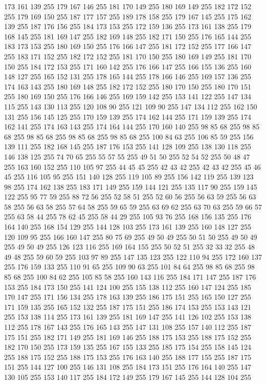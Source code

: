 173 161 139 255 179 167 146 255 181 170 149 255 180 169 149 255 182 172 152 255 179 169 150 255 187 177 157 255 189 178 158 255 179 167 145 255 175 162 139 255 187 176 156 255 184 173 153 255 172 159 136 255 173 161 138 255 179 168 145 255 181 169 147 255 182 169 148 255 182 171 150 255 176 165 144 255 183 173 153 255 180 169 150 255 176 166 147 255 181 172 152 255 177 166 147 255 183 171 152 255 182 172 152 255 181 170 150 255 180 169 149 255 181 170 150 255 184 172 153 255 171 160 142 255 176 166 147 255 166 155 136 255 160 148 127 255 165 152 131 255 178 165 144 255 178 166 146 255 169 157 136 255 174 163 143 255 180 169 148 255 182 172 152 255 180 170 150 255 180 170 151 255 180 169 150 255 176 166 146 255 169 159 142 255 153 141 122 255 147 134 115 255 143 130 113 255 120 108 90 255 121 109 90 255 147 134 112 255 162 150 131 255 156 145 125 255 170 159 139 255 174 162 144 255 171 159 139 255 174 162 141 255 174 163 143 255 174 164 144 255 170 160 140 255 98 85 68 255 98 85 68 255 98 85 68 255
98 85 68 255 98 85 68 255 100 84 63 255 106 85 59 255 156 139 111 255 182 168 145 255 187 176 153 255 141 128 109 255 138 130 118 255 146 138 125 255 74 70 65 255 55 57 55 255 49 51 50 255 52 54 52 255 50 48 47 255 163 160 152 255 110 105 97 255 44 45 45 255 42 43 42 255 42 43 42 255 45 46 45 255 116 105 95 255 151 140 128 255 119 105 89 255 156 142 119 255 139 123 98 255 174 162 138 255 183 171 149 255 159 144 121 255 135 117 90 255 159 145 122 255 95 77 59 255 88 72 56 255 52 58 51 255 52 60 56 255 56 63 59 255 56 63 58 255 56 63 58 255 57 64 58 255 59 65 59 255 63 69 62 255 63 70 63 255 59 66 57 255 63 58 44 255 78 62 45 255 58 44 29 255 105 93 76 255 168 156 135 255 176 164 140 255 168 154 129 255 144 128 103 255 173 161 139 255 160 148 127 255 120 109 95 255 166 160 147 255 80 75 69 255 49 50 49 255 50 51 50 255 49 50 49 255 49 50 49 255 126 123 116 255 169 164 155 255 50 52 51 255 32 33 32 255
48 49 48 255 59 60 59 255 103 97 89 255 147 135 123 255 122 110 94 255 172 160 137 255 176 159 133 255 110 91 65 255 109 90 63 255 101 84 64 255 98 85 68 255 98 85 68 255 100 84 62 255 105 85 58 255 160 143 116 255 184 171 147 255 187 176 153 255 184 173 150 255 141 124 100 255 155 138 112 255 160 147 124 255 185 170 147 255 171 156 134 255 178 163 139 255 186 175 151 255 165 150 127 255 171 159 135 255 165 152 132 255 187 175 151 255 186 174 153 255 153 143 121 255 153 138 114 255 173 161 139 255 181 169 147 255 141 126 102 255 153 138 112 255 178 167 143 255 176 165 143 255 147 131 108 255 157 140 112 255 187 175 151 255 182 171 149 255 181 169 146 255 188 175 153 255 188 175 152 255 182 170 150 255 173 159 135 255 167 155 133 255 185 175 154 255 158 145 124 255 188 175 152 255 188 175 153 255 176 163 140 255 188 177 155 255 187 175 151 255 144 127 100 255 146 131 108 255 184 173 151 255 176 164 140 255 147 130 105 255 153 140 117 255 184 172 149 255 179 167 145 255 144 128 104 255
